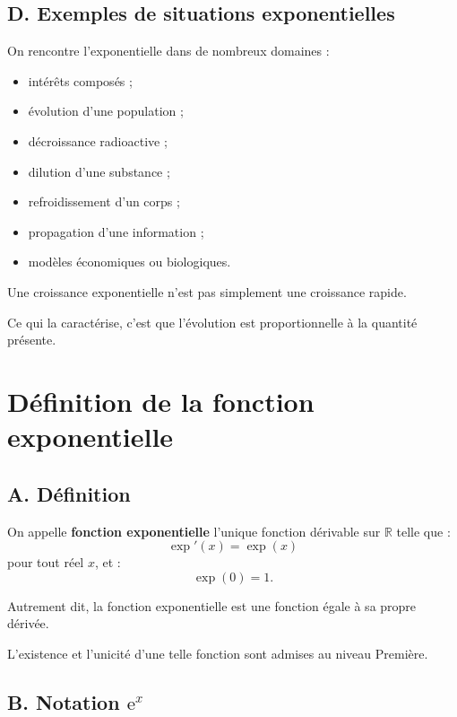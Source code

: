 \documentclass[11pt,a4paper]{article}
\newcommand{\R}{\mathbb{R}}
\newcommand{\e}{\mathrm{e}}
\begin{document}
\subsection*{D. Exemples de situations exponentielles}

On rencontre l'exponentielle dans de nombreux domaines :
\begin{itemize}
    \item intérêts composés ;
    \item évolution d'une population ;
    \item décroissance radioactive ;
    \item dilution d'une substance ;
    \item refroidissement d'un corps ;
    \item propagation d'une information ;
    \item modèles économiques ou biologiques.
\end{itemize}

\begin{erreur}
Une croissance exponentielle n'est pas simplement une croissance rapide.

Ce qui la caractérise, c'est que l'évolution est proportionnelle à la quantité présente.
\end{erreur}

\section{Définition de la fonction exponentielle}

\subsection*{A. Définition}

\begin{definitionbox}
On appelle \textbf{fonction exponentielle} l'unique fonction dérivable sur $\R$ telle que :
\[
\exp'(x)=\exp(x)
\]
pour tout réel $x$, et :
\[
\exp(0)=1.
\]
\end{definitionbox}

Autrement dit, la fonction exponentielle est une fonction égale à sa propre dérivée.

\begin{remarque}
L'existence et l'unicité d'une telle fonction sont admises au niveau Première.
\end{remarque}

\subsection*{B. Notation $\e^x$}
\end{document}
